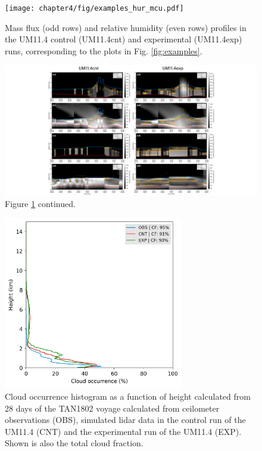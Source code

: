 \clearpage

\begin{figure}[t]
\centering
\texttt{[image: chapter4/fig/examples\_hur\_mcu.pdf]}
\caption[Mass flux and relative humidity profiles]{Mass flux (odd rows) and relative humidity (even rows) profiles in the UM11.4 control (UM11.4cnt)
and experimental (UM11.4exp) runs, corresponding to the plots in Fig. \ref{fig:examples}.
}
\label{fig:examples-hur-mcu}
\end{figure}

\clearpage

\begin{figure}[t]
\centering
\includegraphics[width=\textwidth]{chapter4/fig/examples_hur_mcu_cont.pdf}
\caption{Figure \ref{fig:examples-hur-mcu} continued.
}
\label{fig:examples-hur-mcu-cont}
\end{figure}

\clearpage

\begin{figure}[t]
\centering
\includegraphics[width=0.7\textwidth]{chapter4/fig/cloud_occurrence.png}
\caption[Cloud occurrence histogram as a function of height]{
Cloud occurrence histogram as a function of height calculated from
28 days of the TAN1802 voyage calculated from ceilometer observations (OBS),
simulated lidar data in the control run of the UM11.4 (CNT) and
the experimental run of the UM11.4 (EXP).
Shown is also the total cloud fraction.
}
\label{fig:cloud-occurrence}
\end{figure}

